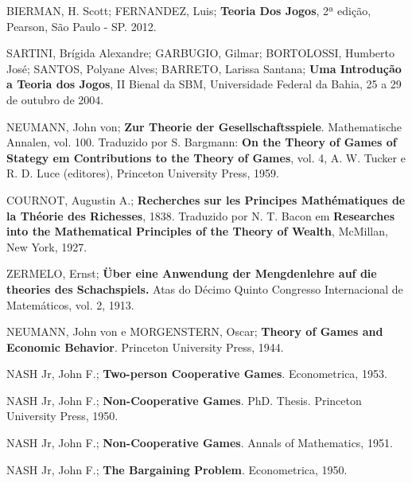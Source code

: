 

\begin{thebibliography}{20}

BIERMAN, H. Scott; FERNANDEZ, Luis;
\textbf{Teoria Dos Jogos},
2ª edição, 
Pearson, São Paulo - SP.
2012.

SARTINI, Brígida Alexandre; GARBUGIO, Gilmar; BORTOLOSSI, Humberto José; SANTOS, Polyane Alves; BARRETO, Larissa Santana;
\textbf{Uma Introdução a Teoria dos Jogos},
II Bienal da SBM, Universidade Federal da Bahia, 25 a 29 de outubro de 2004.

NEUMANN, John von;
\textbf{Zur Theorie der Gesellschaftsspiele}. Mathematische Annalen, vol. 100. Traduzido por S. Bargmann: \textbf{On the Theory of Games of Stategy em Contributions to the Theory of Games}, vol. 4, A. W. Tucker e R. D. Luce (editores), Princeton University Press, 1959.

COURNOT, Augustin A.; 
\textbf{Recherches sur les Principes Mathématiques de la Théorie des Richesses}, 1838. Traduzido por N. T. Bacon em \textbf{Researches into the Mathematical Principles of the Theory of Wealth}, 
McMillan, New York, 1927.

ZERMELO, Ernst;
\textbf{Über eine Anwendung der Mengdenlehre auf die theories des Schachspiels.} Atas do Décimo Quinto Congresso Internacional de Matemáticos, vol. 2, 1913.

NEUMANN, John von e MORGENSTERN, Oscar; \textbf{Theory of Games and Economic Behavior}. 
Princeton University Press, 1944.

NASH Jr, John F.; \textbf{Two-person Cooperative Games}. 
Econometrica, 1953.

NASH Jr, John F.; \textbf{Non-Cooperative Games}. PhD. Thesis. 
Princeton University Press, 1950.

NASH Jr, John F.; \textbf{Non-Cooperative Games}. 
Annals of Mathematics, 1951.

NASH Jr, John F.; \textbf{The Bargaining Problem}. 
Econometrica, 1950.

\end{thebibliography}

